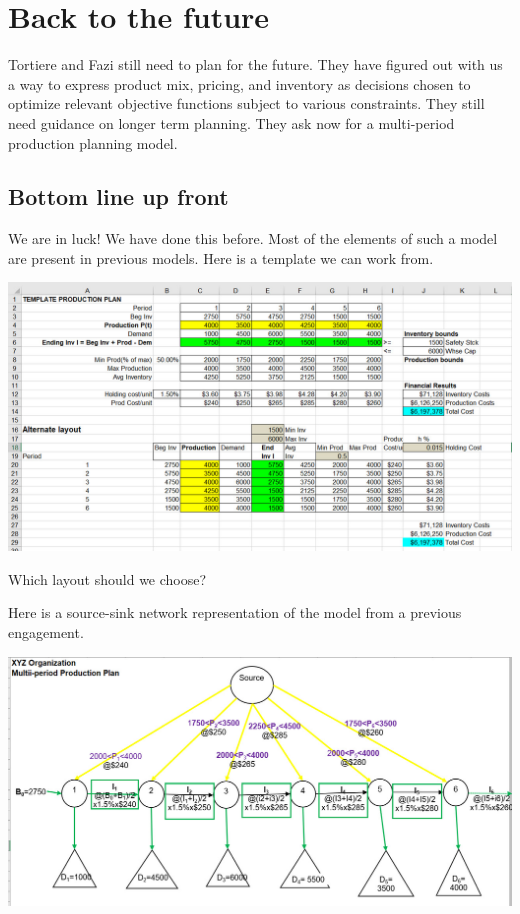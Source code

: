 \documentclass[
]{book}
\begin{document}
\hypertarget{back-to-the-future}{%
\section{Back to the future}\label{back-to-the-future}}

Tortiere and Fazi still need to plan for the future. They have figured out with us a way to express product mix, pricing, and inventory as decisions chosen to optimize relevant objective functions subject to various constraints. They still need guidance on longer term planning. They ask now for a multi-period production planning model.

\hypertarget{bottom-line-up-front}{%
\subsection{Bottom line up front}\label{bottom-line-up-front}}

We are in luck! We have done this before. Most of the elements of such a model are present in previous models. Here is a template we can work from.

\includegraphics{images/04/multi-prod-template.jpg}

Which layout should we choose?

Here is a source-sink network representation of the model from a previous engagement.

\includegraphics{images/04/multi-prod-network-old.jpg}
\end{document}
